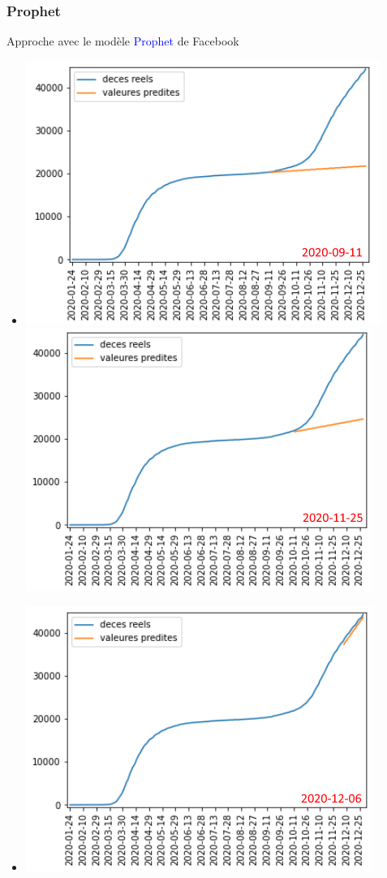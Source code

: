 \documentclass{beamer}[aspectratio = 43]
\begin{document}
\begin{frame}
	\frametitle{Prophet}
	Approche avec le modèle \textcolor{blue}{Prophet} de 
Facebook
	\begin{itemize}
		\item[]\includegraphics[scale=0.4]{prophet_bpt}
		\includegraphics[scale=0.4]{prophet_mpt}
		\item[]\includegraphics[scale=0.4]{prophet_ppt}
	\end{itemize}
\end{frame}
\end{document}
